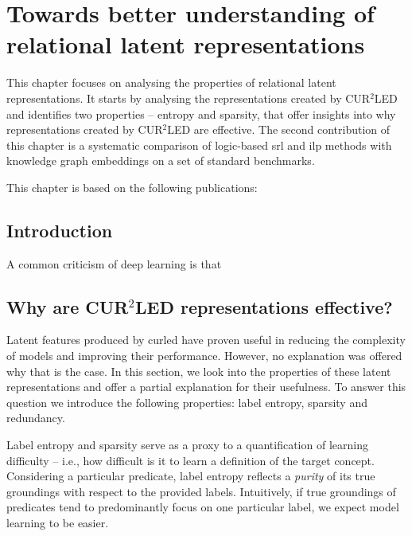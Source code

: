 \chapter{Towards better understanding of relational latent representations}\label{ch:embeddinganalysis}


This chapter focuses on analysing the properties of relational latent representations.
It starts by analysing the representations created by CUR$^2$LED and identifies two properties -- entropy and sparsity, that offer insights into why representations created by CUR$^2$LED are effective.
The second contribution of this chapter is a systematic comparison of logic-based \gls{srl} and \gls{ilp} methods with knowledge graph embeddings on a set of standard benchmarks.

This chapter is based on the following publications:

\begin{quote}
\end{quote}

\begin{quote}
\end{quote}

\section{Introduction}


A common criticism of deep learning is that 



\section{Why are CUR$^2$LED representations effective?}

Latent features produced by \gls{curled} have proven useful in reducing the complexity of models and improving their performance.
However, no explanation was offered why that is the case.
In this section, we look into the properties of these latent representations and offer a partial explanation for their usefulness.
To answer this question we introduce the following properties: label entropy, sparsity and redundancy.



Label entropy and sparsity serve as a proxy to a quantification of learning difficulty -- i.e., how difficult is it to learn a definition of the target concept.
Considering a particular predicate, label entropy reflects a \textit{purity} of its true groundings with respect to the provided labels.
Intuitively, if true groundings of predicates tend to predominantly focus on one particular label, we expect model learning to be easier.


